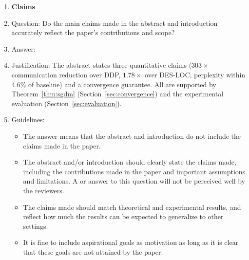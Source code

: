 \documentclass{article}
\begin{document}
\begin{enumerate}

\item {\bf Claims}
    \item[] Question: Do the main claims made in the abstract and introduction accurately reflect the paper's contributions and scope?
    \item[] Answer: \answerYes{}
    \item[] Justification: The abstract states three quantitative claims ($303{\times}$ communication reduction over DDP, $1.78{\times}$ over DES-LOC, perplexity within $4.6\%$ of baseline) and a convergence guarantee. All are supported by Theorem~\ref{thm:sgdm} (Section~\ref{sec:convergence}) and the experimental evaluation (Section~\ref{sec:evaluation}).
    \item[] Guidelines:
    \begin{itemize}
        \item The answer \answerNA{} means that the abstract and introduction do not include the claims made in the paper.
        \item The abstract and/or introduction should clearly state the claims made, including the contributions made in the paper and important assumptions and limitations. A \answerNo{} or \answerNA{} answer to this question will not be perceived well by the reviewers. 
        \item The claims made should match theoretical and experimental results, and reflect how much the results can be expected to generalize to other settings. 
        \item It is fine to include aspirational goals as motivation as long as it is clear that these goals are not attained by the paper. 
    \end{itemize}


\end{enumerate}
\end{document}
